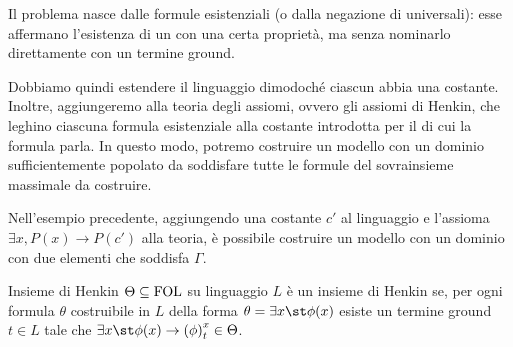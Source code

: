 Il problema nasce dalle formule esistenziali (o dalla negazione di universali): esse affermano l'esistenza di un  con una certa proprietà, ma senza nominarlo direttamente con un termine ground.

Dobbiamo quindi estendere il linguaggio dimodoché ciascun  abbia una costante. Inoltre, aggiungeremo alla teoria degli assiomi, ovvero gli assiomi di Henkin, che leghino ciascuna formula esistenziale alla costante introdotta per il  di cui la formula parla.
In questo modo, potremo costruire un modello con un dominio sufficientemente popolato da soddisfare tutte le formule del sovrainsieme massimale da costruire.

Nell'esempio precedente, aggiungendo una costante \(c'\) al linguaggio e l'assioma \(\exists x, P(x) \to P(c')\) alla teoria, è possibile costruire un modello con un dominio con due elementi che soddisfa \(\Gamma\).

\begin{definition}{Insieme di Henkin}
  \(\Theta \subseteq \FOL\) su linguaggio \(L\) è un insieme di Henkin se, per ogni formula \(\theta\) costruibile in \(L\) della forma \(\theta = \exists x\st \phi(x)\) esiste un termine ground \(t \in L\) tale che \(\exists x\st \phi(x) \to \subs{\phi}{x}{t} \in \Theta\).
\end{definition}

